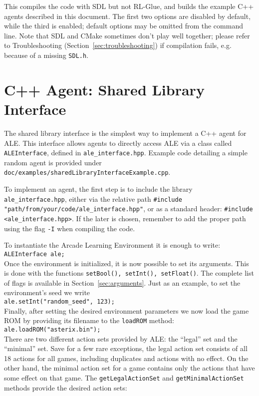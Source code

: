 \documentclass[12pt]{article}
\begin{document}
This compiles the code with SDL but not RL-Glue, and builds the example C++ agents described
in this document. The first two options are disabled by default, while the third is
enabled; default options may be omitted from the command line. Note that SDL and CMake sometimes 
don't play well together; please refer to Troubleshooting 
(Section~\ref{sec:troubleshooting}) if compilation fails, e.g. because of a missing \verb+SDL.h+.

\section{C++ Agent: Shared Library Interface} \label{sec:shared_library_interface}

The shared library interface is the simplest way to implement a C++ agent for ALE.
This interface allows agents to directly access ALE via a class called
\verb+ALEInterface+, defined in \verb+ale_interface.hpp+. Example code detailing a simple random agent is provided under \verb+doc/examples/sharedLibraryInterfaceExample.cpp+.

To implement an agent, the first step is to include the library \verb+ale_interface.hpp+, either via 
the relative path \verb+#include "path/from/your/code/ale_interface.hpp"+, or as a standard 
header: \verb+#include <ale_interface.hpp>+. If the later is chosen, remember to add the proper 
path using the flag \verb+-I+ when compiling the code.

To instantiate the Arcade Learning Environment it is enough to write:\\

\verb+ALEInterface ale;+\\

Once the environment is initialized, it is now possible to set its arguments. This is done with the 
functions \verb+setBool(), setInt(), setFloat()+. The complete list of flags is available in 
Section~\ref{sec:arguments}. Just as an example, to set the environment's seed we write \\
\verb+ale.setInt("random_seed", 123);+\\

Finally, after setting the desired environment parameters we now load the game ROM by providing its filename to the \verb+loadROM+ method:\\

\verb+ale.loadROM("asterix.bin");+\\

There are two different action sets provided by ALE: the ``legal'' set and the ``minimal'' 
set. Save for a few rare exceptions, the legal action set consists of all 18 actions for all games, including duplicates and actions with no effect. On the other hand, the minimal action set for a game contains only 
the actions that have some effect on that game. The \verb+getLegalActionSet+ and \verb+getMinimalActionSet+ methods provide the desired action sets:\\ 
\end{document}
